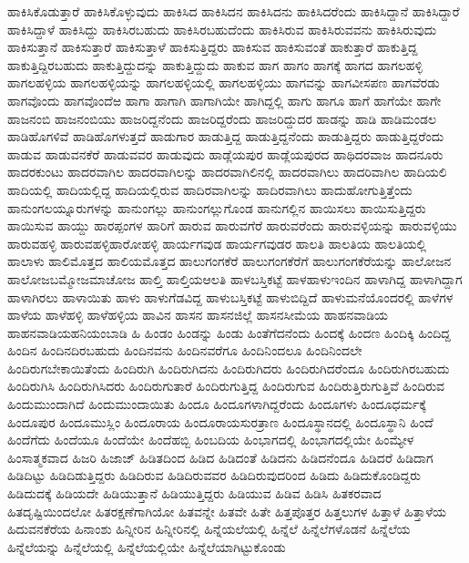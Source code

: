 {ಹಾಕಿಸಿಕೊಡುತ್ತಾರೆ
ಹಾಕಿಸಿಕೊಳ್ಳುವುದು
ಹಾಕಿಸಿದ
ಹಾಕಿಸಿದನ
ಹಾಕಿಸಿದನು
ಹಾಕಿಸಿದರೆಂದು
ಹಾಕಿಸಿದ್ದಾನೆ
ಹಾಕಿಸಿದ್ದಾರೆ
ಹಾಕಿಸಿದ್ದಾಳೆ
ಹಾಕಿಸಿದ್ದು
ಹಾಕಿಸಿರಬಹುದು
ಹಾಕಿಸಿರಬಹುದೆಂದು
ಹಾಕಿಸಿರುವ
ಹಾಕಿಸಿರುವವನು
ಹಾಕಿಸಿರುವುದು
ಹಾಕಿಸುತ್ತಾನೆ
ಹಾಕಿಸುತ್ತಾರೆ
ಹಾಕಿಸುತ್ತಾಳೆ
ಹಾಕಿಸುತ್ತಿದ್ದರು
ಹಾಕಿಸುವ
ಹಾಕಿಸುವಂತೆ
ಹಾಕುತ್ತಾರೆ
ಹಾಕುತ್ತಿದ್ದ
ಹಾಕುತ್ತಿದ್ದಿರಬಹುದು
ಹಾಕುತ್ತಿದ್ದುದನ್ನು
ಹಾಕುತ್ತಿದ್ದುದು
ಹಾಕುವ
ಹಾಗ
ಹಾಗಂ
ಹಾಗಕ್ಕೆ
ಹಾಗದ
ಹಾಗಲಹಳ್ಳಿ
ಹಾಗಲಹಳ್ಳಿಯ
ಹಾಗಲಹಳ್ಳಿಯನ್ನು
ಹಾಗಲಹಳ್ಳಿಯಲ್ಲಿ
ಹಾಗಲಹಳ್ಳಿಯು
ಹಾಗವನ್ನು
ಹಾಗವೀಸಪಣ
ಹಾಗವೆರಡು
ಹಾಗವೊಂದು
ಹಾಗವೊಂದೆಱ
ಹಾಗಾ
ಹಾಗಾಗಿ
ಹಾಗಾಗಿಯೇ
ಹಾಗಿದ್ದಲ್ಲಿ
ಹಾಗು
ಹಾಗೂ
ಹಾಗೆ
ಹಾಗೆಯೇ
ಹಾಗೇ
ಹಾಜನಂಬಿ
ಹಾಜನಂಬಿಯು
ಹಾಜರಿದ್ದನೆಂದು
ಹಾಜರಿದ್ದರೆಂದು
ಹಾಜರಿದ್ದುದರ
ಹಾಡನ್ನು
ಹಾಡಿ
ಹಾಡಿಮಂಡಲ
ಹಾಡಿಹೊಗಳಿವೆ
ಹಾಡಿಹೊಗಳುತ್ತದೆ
ಹಾಡುಗಾರ
ಹಾಡುತ್ತಿದ್ದ
ಹಾಡುತ್ತಿದ್ದನೆಂದು
ಹಾಡುತ್ತಿದ್ದರು
ಹಾಡುತ್ತಿದ್ದರೆಂದು
ಹಾಡುವ
ಹಾಡುವನಕೆರೆ
ಹಾಡುವವರ
ಹಾಡುವುದು
ಹಾಡ್ಲೆಯಪುರ
ಹಾಡ್ಲೆಯಪುರದ
ಹಾಥಿದರವಾಜ
ಹಾದನೂರು
ಹಾದರಕುಂಟು
ಹಾದರವಾಗಿಲ
ಹಾದರವಾಗಿಲನ್ನು
ಹಾದರವಾಗಿಲಿನಲ್ಲಿ
ಹಾದರವಾಗಿಲು
ಹಾದರಿವಾಗಿಲ
ಹಾದಿಯಲಿ
ಹಾದಿಯಲ್ಲಿ
ಹಾದಿಯಲ್ಲಿದ್ದ
ಹಾದಿಯಲ್ಲಿರುವ
ಹಾದಿರವಾಗಿಲನ್ನು
ಹಾದಿರವಾಗಿಲು
ಹಾದುಹೋಗುತ್ತಿತ್ತೆಂದು
ಹಾನುಂಗಲಯ್ನೂರುಗಳನ್ನು
ಹಾನುಂಗಲ್ಲು
ಹಾನುಂಗಲ್ಲುಗೊಂಡ
ಹಾನುಗಲ್ಲಿನ
ಹಾಯಿಸಲು
ಹಾಯಿಸುತ್ತಿದ್ದರು
ಹಾಯಿಸುವ
ಹಾಯ್ದು
ಹಾರಪ್ಪಂಗಳ
ಹಾರಿಗೆ
ಹಾರುವ
ಹಾರುವಗೆರೆ
ಹಾರುವರೆಂದು
ಹಾರುವಳ್ಳಿಯನ್ನು
ಹಾರುವಳ್ಳಿಯು
ಹಾರುವಹಳ್ಳಿ
ಹಾರುವಹಳ್ಳಿಹಾರೋಹಳ್ಳಿ
ಹಾರ್ಯಗವುಡ
ಹಾರ್ಯಗವುಡರ
ಹಾಲತಿ
ಹಾಲತಿಯ
ಹಾಲತಿಯಲ್ಲಿ
ಹಾಲಾಳು
ಹಾಲಿಮೊತ್ತದ
ಹಾಲಿಯಮೊತ್ತದ
ಹಾಲುಗಂಗಕೆರೆ
ಹಾಲುಗಂಗಕೆರೆಗೆ
ಹಾಲುಗಂಗಕೆರೆಯನ್ನು
ಹಾಲೋಜನ
ಹಾಲೋಜಬಮ್ಮೋಜಮಾಚೋಜ
ಹಾಲ್ತಿ
ಹಾಲ್ತಿಯಆಲತಿ
ಹಾಳಬಸ್ತಿಕಟ್ಟೆ
ಹಾಳಹಾಳುಇಂದಿನ
ಹಾಳಾಗಿದ್ದ
ಹಾಳಾಗಿದ್ದಾಗ
ಹಾಳಾಗಿರಲು
ಹಾಳಾಯಿತು
ಹಾಳು
ಹಾಳುಗೆಡವಿದ್ದ
ಹಾಳುಬಸ್ತಿಕಟ್ಟೆ
ಹಾಳುಬಿದ್ದಿದೆ
ಹಾಳುಮನೆಯೊಂದರಲ್ಲಿ
ಹಾಳೆಗಳ
ಹಾಳೆಯ
ಹಾಳೆಹಳ್ಳಿ
ಹಾಳೆಹಳ್ಳಿಯ
ಹಾವಿನ
ಹಾಸನ
ಹಾಸನಜಿಲ್ಲೆ
ಹಾಸನಸೀಮೆಯ
ಹಾಹನವಾಡಿಯ
ಹಾಹನವಾಡಿಯಹನಿಯಂಬಾಡಿ
ಹಿ
ಹಿಂಡಂ
ಹಿಂಡನ್ನು
ಹಿಂಡು
ಹಿಂತೆಗೆದನೆಂದು
ಹಿಂದಕ್ಕೆ
ಹಿಂದಣ
ಹಿಂದಿಕ್ಕಿ
ಹಿಂದಿದ್ದ
ಹಿಂದಿನ
ಹಿಂದಿನದಿರಬಹುದು
ಹಿಂದಿನವನು
ಹಿಂದಿನವರೆಗೂ
ಹಿಂದಿನಿಂದಲೂ
ಹಿಂದಿನಿಂದಲೇ
ಹಿಂದಿರುಗಬೇಕಾಯಿತೆಂದು
ಹಿಂದಿರುಗಿ
ಹಿಂದಿರುಗಿದನು
ಹಿಂದಿರುಗಿದರು
ಹಿಂದಿರುಗಿದರೆಂದೂ
ಹಿಂದಿರುಗಿರಬಹುದು
ಹಿಂದಿರುಗಿಸಿ
ಹಿಂದಿರುಗಿಸಿದರು
ಹಿಂದಿರುಗುತಾರೆ
ಹಿಂದಿರುಗುತ್ತಿದ್ದ
ಹಿಂದಿರುಗುವ
ಹಿಂದಿರುತ್ತಿರುಗುತ್ತಿವೆ
ಹಿಂದಿರುವ
ಹಿಂದುಮುಂದಾಗಿದೆ
ಹಿಂದುಮುಂದಾಯಿತು
ಹಿಂದೂ
ಹಿಂದೂಗಳಾಗಿದ್ದರೆಂದು
ಹಿಂದೂಗಳು
ಹಿಂದೂಧರ್ಮಕ್ಕೆ
ಹಿಂದೂಪುರ
ಹಿಂದೂಮುಸ್ಲಿಂ
ಹಿಂದೂರಾಯ
ಹಿಂದೂರಾಯಸುರತ್ರಾಣ
ಹಿಂದೂಸ್ಥಾನದಲ್ಲಿ
ಹಿಂದೂಸ್ಥಾನಿ
ಹಿಂದೆ
ಹಿಂದೆಗೆದು
ಹಿಂದೆಯೂ
ಹಿಂದೆಯೇ
ಹಿಂದೆಹಬ್ಬಿ
ಹಿಂಬದಿಯ
ಹಿಂಭಾಗದಲ್ಲಿ
ಹಿಂಭಾಗದಲ್ಲಿಯೇ
ಹಿಂಮ್ಯೇಳ
ಹಿಂಸಾತ್ಮಕವಾದ
ಹಿಜರಿ
ಹಿಜಾಜ್
ಹಿಡಿತದಿಂದ
ಹಿಡಿದ
ಹಿಡಿದಂತೆ
ಹಿಡಿದನು
ಹಿಡಿದನೆಂದೂ
ಹಿಡಿದರೆ
ಹಿಡಿದಾಗ
ಹಿಡಿದಿಟ್ಟು
ಹಿಡಿದಿಡುತ್ತಿದ್ದರು
ಹಿಡಿದಿರುವ
ಹಿಡಿದಿರುವವರ
ಹಿಡಿದಿರುವುದರಿಂದ
ಹಿಡಿದು
ಹಿಡಿದುಕೊಂಡಿದ್ದರು
ಹಿಡಿದುದಕ್ಕೆ
ಹಿಡಿಯದೇ
ಹಿಡಿಯುತ್ತಾನೆ
ಹಿಡಿಯುತ್ತಿದ್ದರು
ಹಿಡಿಯುವ
ಹಿಡಿವ
ಹಿಡಿಸಿ
ಹಿತಕರವಾದ
ಹಿತದೃಷ್ಟಿಯಿಂದಲೋ
ಹಿತರಕ್ಷಣೆಗಾಗಿಯೋ
ಹಿತವನ್ನೇ
ಹಿತವೇ
ಹಿತೇ
ಹಿತ್ತಪೊತ್ತರ
ಹಿತ್ತಲುಗಳ
ಹಿತ್ತಾಳೆ
ಹಿತ್ತಾಳೆಯ
ಹಿದುವನಕೆರೆಯ
ಹಿನಾಂಶು
ಹಿನ್ನೀರಿನ
ಹಿನ್ನೀರಿನಲ್ಲಿ
ಹಿನ್ನೆಯಲೆಯಲ್ಲಿ
ಹಿನ್ನೆಲೆ
ಹಿನ್ನೆಲೆಗಳೊಡನೆ
ಹಿನ್ನೆಲೆಯ
ಹಿನ್ನೆಲೆಯನ್ನು
ಹಿನ್ನೆಲೆಯಲ್ಲಿ
ಹಿನ್ನೆಲೆಯಲ್ಲಿಯೇ
ಹಿನ್ನೆಲೆಯಾಗಿಟ್ಟುಕೊಂಡು
}
